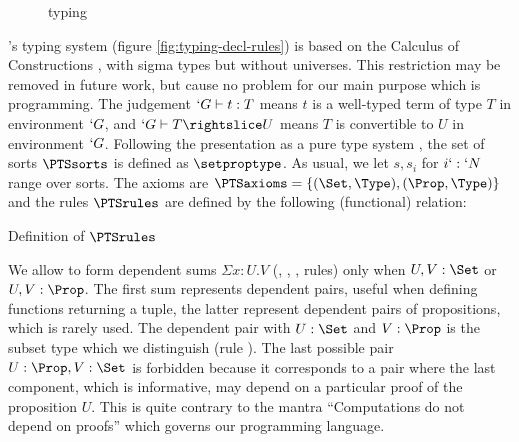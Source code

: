 \documentclass[twocolumn]{article}
\begin{document}
\begin{figure*}[t]
    \def\seq{\typed}
    \def\fCenter{\wf}
    \begin{center}
      \WfEmpty\DP\WfVar\DP
      \Var\DP
    \end{center}
    
    \def\fCenter{\typed}
    \begin{center}
      \PropSet\DP
      \Subsum\DP
    \end{center}
    
    \Prod\DP
    \SigmaR\DP

    \vspace{\infvspace}
    \Abs\DP
    \SumDep\DP

    \vspace{\infvspace}
    \quad\App\DP
    \quad\quad
    \PiLeft\DP
    \quad
    \PiRight\DP

    \begin{center}\SubsetR\DP\end{center}
    \caption{\Russell{} typing}
  \label{fig:typing-decl-rules}
\end{figure*}

\Russell{}'s typing system (figure \vref{fig:typing-decl-rules}) is based
on the Calculus of Constructions \cite{CoquandHuet,Barras99}, with sigma types but without universes.
This restriction may be removed in future work, but cause no problem for
our main purpose which is programming. The judgement $`G \vdash t : T$
means $t$ is a well-typed term of type $T$ in environment $`G$, and $`G
\typed T \subd U$ means $T$ is convertible to $U$ in environment $`G$. 
Following the presentation as a pure type system \cite{PTS}, 
the set of sorts $\PTSsorts$ is defined as $\setproptype$. As usual, we
let $s, s_i$ for $i `: `N$ range over sorts. The
axioms are $\PTSaxioms = \{ (\Set, \Type), (\Prop, \Type) \}$ and the
rules $\PTSrules$ are defined by the following (functional) relation:
\begin{table}[h]
  \vspace{-1.5em}
  \axiomsd
  \vspace{-2em}
  \caption{Definition of $\PTSrules$}
  \label{fig:PTSrules}
\end{table}

We allow to form dependent sums $\Sigma x : U.V$ (, ,
,  rules) only when $U, V : \Set$
or $U, V : \Prop$. The first sum represents dependent pairs, useful
when defining functions returning a tuple, the latter represent
dependent pairs of propositions, which is rarely used. The dependent
pair with $U : \Set$ and $V : \Prop$ is the subset type which we
distinguish (rule ). The last possible pair $U : \Prop, V : \Set$ is forbidden
because it corresponds to a pair where the last component, which is
informative, may depend on a particular proof of the proposition
$U$. This is quite contrary to the mantra ``Computations do not depend
on proofs'' which governs our programming language.
\end{document}
